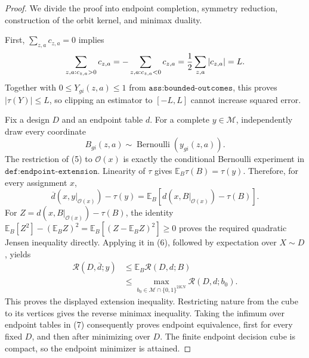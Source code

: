 \documentclass{article}
\begin{document}
\begin{proof}
We divide the proof into endpoint completion, symmetry reduction, construction of the orbit kernel, and minimax duality.

First, \(\sum_{z,a}c_{z,a}=0\) implies
\[
 \sum_{z,a:c_{z,a}>0}c_{z,a}
 =-\sum_{z,a:c_{z,a}<0}c_{z,a}
 ={1\over2}\sum_{z,a}|c_{z,a}|=L.
\]
Together with \(0\le Y_{gi}(z,a)\le1\) from \(\texttt{ass:bounded-outcomes}\), this proves \(|\tau(Y)|\le L\), so clipping an estimator to \([-L,L]\) cannot increase squared error.

Fix a design \(D\) and an endpoint table \(d\).  For a complete \(y\in\mathcal M\), independently draw every coordinate
\[
 B_{gi}(z,a)\sim\operatorname{Bernoulli}(y_{gi}(z,a)).                       \tag{5}
\]
The restriction of (5) to \(\mathcal O(x)\) is exactly the conditional Bernoulli experiment in \(\texttt{def:endpoint-extension}\).  Linearity of \(\tau\) gives \(\mathbb E_B\tau(B)=\tau(y)\).  Therefore, for every assignment \(x\),
\[
 \overline d(x,y|_{\mathcal O(x)})-\tau(y)
 =\mathbb E_B\!\left[d(x,B|_{\mathcal O(x)})-\tau(B)\right].             \tag{6}
\]
For \(Z=d(x,B|_{\mathcal O(x)})-\tau(B)\), the identity
\(\mathbb E_B[Z^2]-(\mathbb E_B Z)^2
=\mathbb E_B[(Z-\mathbb E_B Z)^2]\ge0\) proves the required quadratic Jensen
inequality directly.  Applying it in (6), followed by expectation over
\(X\sim D\), yields
\[
\begin{aligned}
 \mathcal R(D,\overline d;y)
 &\le \mathbb E_B\mathcal R(D,d;B)\\
 &\le \max_{b_0\in\mathcal M\cap\{0,1\}^{2KN}}
            \mathcal R(D,d;b_0).
\end{aligned}                                                               \tag{7}
\]
This proves the displayed extension inequality.  Restricting nature from the cube to its vertices gives the reverse minimax inequality.  Taking the infimum over endpoint tables in (7) consequently proves endpoint equivalence, first for every fixed \(D\), and then after minimizing over \(D\).  The finite endpoint decision cube is compact, so the endpoint minimizer is attained.


\end{proof}
\end{document}

